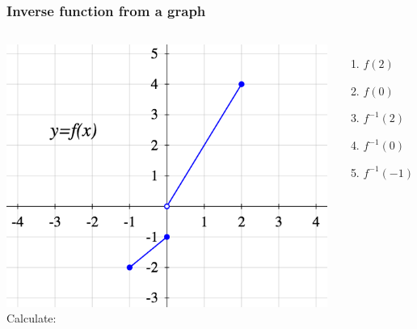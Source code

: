 \begin{frame}
	\frametitle{Inverse function from a graph}

	\begin{columns}[c]
		\includegraphics[scale=.4]{G12}
		Calculate:
		\begin{enumerate}
			\item $\displaystyle f(2)$

			\item $\displaystyle f(0)$

			\item $\displaystyle f^{-1}(2)$

			\item $\displaystyle f^{-1}(0)$

			\item $\displaystyle f^{-1}(-1)$
		\end{enumerate}
	\end{columns}
\end{frame}


